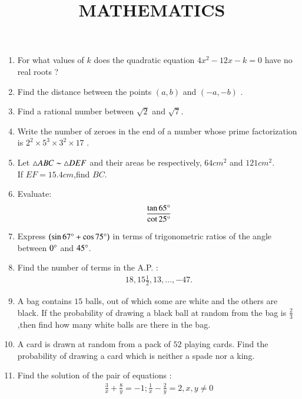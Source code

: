 \documentclass[12pt,-letter paper]{article}
\title{MATHEMATICS }
\providecommand{\brak}[1]{\ensuremath{\left(#1\right)}}
\begin{document}
\maketitle
\begin{enumerate}

\item For what values of $k$ does the quadratic equation $4x^2 - 12x - k = 0$ have 
no real roots ?

\item Find the distance between the points $\brak{a,b}$ and $\brak{-a,-b}$ .

\item Find a rational number between  $\sqrt2$ and $\sqrt7$.

\item Write the number of zeroes in the end of a number whose prime factorization is $2^2 \times 5^3 \times 3^2 \times 17$ .

\item Let $\triangle ABC  \thicksim  \triangle DEF$  and their areas be respectively, $64cm^2$ and $121cm^2$.\\If $EF=15.4cm$,find $BC$.

\item  Evaluate:
\begin{align*}
    \frac {\tan 65\degree}  {\cot 25\degree}
\end{align*}

\item Express $\brak{{\sin 67\degree}+ {\cos 75\degree}}$ in terms of trigonometric ratios of the angle between $0\degree$ and $45\degree$.

\item Find the number of terms in the A.P. :
\begin{align*}
    18,15\frac{1}{2},13, ...,-47.
\end{align*}

\item A bag contains $15$ balls, out of which some are white and the others are black. If the probability of drawing a black ball at random from the bag is $\frac{2}{3}$ ,then find how many white balls are there in the bag.

\item A card is drawn at random from a pack of $52$ playing cards. Find the probability of drawing a card which is neither a spade nor a king.

\item Find the solution of the pair of equations :
\begin{align*}
    \frac{3}{x}+\frac{8}{y}=-1; \frac{1}{x}-\frac{2}{y}=2,x,y\neq 0
\end{align*}


\end{enumerate}
\end{document}
